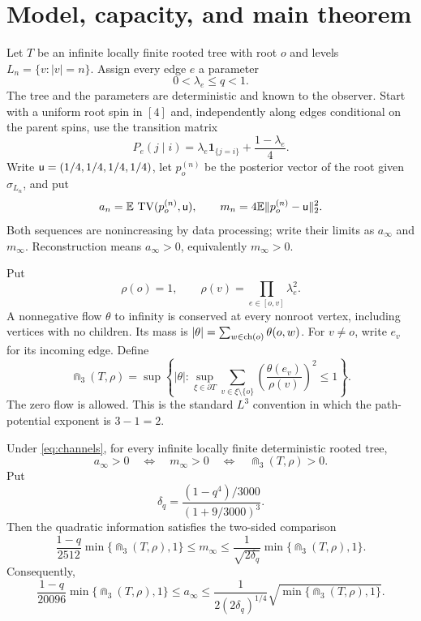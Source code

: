 \section{Model, capacity, and main theorem}\label{sec:model}

Let $T$ be an infinite locally finite rooted tree with root $o$ and
levels $L_n=\{v:|v|=n\}$. Assign every edge $e$ a parameter
\begin{equation}\label{eq:channels}
0<\lambda_e\le q<1.
\end{equation}
The tree and the parameters are deterministic and known to the observer.
Start with a uniform root spin in $[4]$ and, independently along edges
conditional on the parent spins, use the transition matrix
\[
P_e(j\mid i)=\lambda_e\mathbf1_{\{j=i\}}+\frac{1-\lambda_e}{4}.
\]
Write $\mathsf u=(1/4,1/4,1/4,1/4)$, let $p_o^{(n)}$ be the posterior
vector of the root given $\sigma_{L_n}$, and put
\[
a_n=\mathbb E\,\operatorname{TV}(p_o^{(n)},\mathsf u),
\qquad
m_n=4\mathbb E\|p_o^{(n)}-\mathsf u\|_2^2.
\]
Both sequences are nonincreasing by data processing; write their limits as
$a_\infty$ and $m_\infty$.  Reconstruction means $a_\infty>0$, equivalently
$m_\infty>0$.

Put
\begin{equation}\label{eq:rho}
\rho(o)=1,\qquad
\rho(v)=\prod_{e\in[o,v]}\lambda_e^2.
\end{equation}
A nonnegative flow $\theta$ to infinity is conserved at every nonroot
vertex, including vertices with no children. Its mass is
$|\theta|=\sum_{w\in\operatorname{ch}(o)}\theta(o,w)$. For $v\ne o$, write
$e_v$ for its incoming edge. Define
\begin{equation}\label{eq:capacity}
\Cap_3(T,\rho)=\sup\left\{|\theta|:
\sup_{\xi\in\partial T}\sum_{v\in\xi\setminus\{o\}}
\left(\frac{\theta(e_v)}{\rho(v)}\right)^2\le1\right\}.
\end{equation}
The zero flow is allowed. This is the standard $L^3$ convention in which
the path-potential exponent is $3-1=2$.

\begin{theorem}\label{thm:main}
Under \eqref{eq:channels}, for every infinite locally finite deterministic
rooted tree,
\[
\boxed{\quad a_\infty>0\quad\Longleftrightarrow\quad
m_\infty>0\quad\Longleftrightarrow\quad
\Cap_3(T,\rho)>0.\quad}
\]
Put
\[
\delta_q=\frac{(1-q^4)/3000}{(1+9/3000)^3}.
\]
Then the quadratic information satisfies the two-sided comparison
\begin{equation}\label{eq:quantitative-m}
\frac{1-q}{2512}\min\{\Cap_3(T,\rho),1\}
\le m_\infty
\le \frac1{\sqrt{2\delta_q}}\min\{\Cap_3(T,\rho),1\}.
\end{equation}
Consequently,
\begin{equation}\label{eq:quantitative}
\frac{1-q}{20096}\min\{\Cap_3(T,\rho),1\}
\le a_\infty
\le \frac1{2(2\delta_q)^{1/4}}
       \sqrt{\min\{\Cap_3(T,\rho),1\}}.
\end{equation}
\end{theorem}

